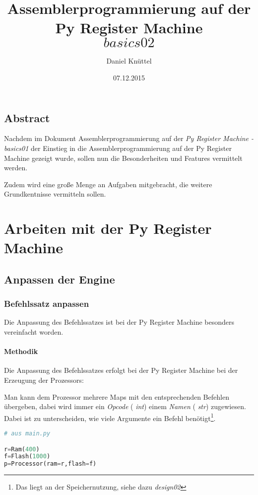 \documentclass[a4paper,12pt,oneside]{scrreprt}
\title{ Assemblerprogrammierung auf der Py Register Machine \[basics 02\]}
\author{Daniel Knüttel}
\date{07.12.2015}
\begin{document}
\maketitle
\tableofcontents

\chapter{Abstract}

Nachdem im Dokument Assemblerprogrammierung auf der \textit{ Py Register Machine - basics01} der Einstieg in die Assemblerprogrammierung auf 
der Py Register Machine gezeigt wurde, sollen nun die Besonderheiten und Features vermittelt werden.

Zudem wird eine große Menge an Aufgaben mitgebracht, die weitere Grundkentnisse vermitteln sollen.

\part{Arbeiten mit der Py Register Machine}

\chapter{Anpassen der Engine}

\section{Befehlssatz anpassen}

Die Anpassung des Befehlssatzes ist bei der Py Register Machine besonders vereinfacht worden.

\subsection{Methodik}

Die Anpassung des Befehlssatzes erfolgt bei der Py Register Machine bei der Erzeugung der Prozessors:

Man kann dem Prozessor mehrere Maps mit den entsprechenden Befehlen übergeben, dabei wird immer ein \textit{ Opcode} ( \textit{int}) einem \textit{Namen} ( \textit{str}) zugewiesen. 
Dabei ist zu unterscheiden, wie viele Argumente ein Befehl benötigt\footnote{Das liegt an der Speichernutzung, siehe dazu \textit{ design02}}.

\begin{lstlisting}[language=python]
# aus main.py

r=Ram(400)
f=Flash(1000)
p=Processor(ram=r,flash=f)

\end{lstlisting}
\end{document}
